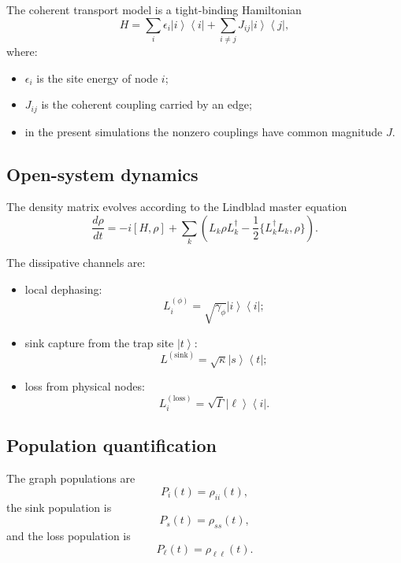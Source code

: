 \documentclass[11pt,a4paper]{article}
\newcommand{\ket}[1]{\left|#1\right\rangle}
\newcommand{\bra}[1]{\left\langle#1\right|}
\begin{document}
The coherent transport model is a tight-binding Hamiltonian
\begin{equation}
H = \sum_i \epsilon_i \ket{i}\bra{i} + \sum_{i\neq j} J_{ij}\ket{i}\bra{j},
\end{equation}
where:
\begin{itemize}
  \item $\epsilon_i$ is the site energy of node $i$;
  \item $J_{ij}$ is the coherent coupling carried by an edge;
  \item in the present simulations the nonzero couplings have common magnitude $J$.
\end{itemize}

\subsection{Open-system dynamics}

The density matrix evolves according to the Lindblad master equation
\begin{equation}
\frac{d\rho}{dt}
= -i[H,\rho]
+ \sum_k \left(L_k\rho L_k^\dagger - \frac12\{L_k^\dagger L_k,\rho\}\right).
\end{equation}

The dissipative channels are:
\begin{itemize}
  \item local dephasing:
  \begin{equation}
  L_i^{(\phi)}=\sqrt{\gamma_\phi}\ket{i}\bra{i};
  \end{equation}
  \item sink capture from the trap site $\ket{t}$:
  \begin{equation}
  L^{(\mathrm{sink})}=\sqrt{\kappa}\ket{s}\bra{t};
  \end{equation}
  \item loss from physical nodes:
  \begin{equation}
  L_i^{(\mathrm{loss})}=\sqrt{\Gamma}\ket{\ell}\bra{i}.
  \end{equation}
\end{itemize}

\subsection{Population quantification}

The graph populations are
\begin{equation}
P_i(t)=\rho_{ii}(t),
\end{equation}
the sink population is
\begin{equation}
P_s(t)=\rho_{ss}(t),
\end{equation}
and the loss population is
\begin{equation}
P_\ell(t)=\rho_{\ell\ell}(t).
\end{equation}
\end{document}
